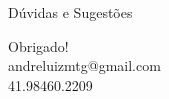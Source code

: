 \documentclass[
presentation.tex
]{subfiles}
\begin{document}

{
	\begin{frame}[standout]
		Dúvidas e Sugestões
	\end{frame}
	}
	
{
	\begin{frame}[standout]
		Obrigado! \\
		andreluizmtg@gmail.com\\
		41.98460.2209
	\end{frame}
	}
\end{document}
